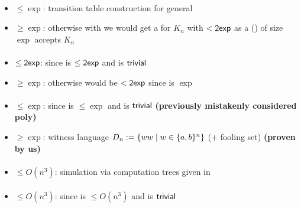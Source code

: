 \paragraph{\OMODLA{}\tto\ODFA}\label{cost:OM1DLAto1DFA}
\begin{itemize}
	\item $\le\exp$: transition table construction for general \OLA \cite{PigPis14}
	\item $\ge\exp$: otherwise with \hyperref[cost:OM1DLAto1DFA]{\OMODLA{}\tto\ODFA} we would get a \ODFA for $K_n$ with $<\mathsf{2exp}$ as a \OMODLA (\TDFA) of size $\exp$ accepts $K_n$
\end{itemize}
\paragraph{\OMOLA{}\tto\OMODLA}
\begin{itemize}
	\item $\le\mathsf{2exp}$: since \hyperref[cost:OM1LAto1DFA]{\OMOLA{}\tto\ODFA} is $\le\mathsf{2exp}$ and \ODFA{}\tto\OMODLA is $\mathsf{trivial}$
	\item $\ge\exp$: otherwise \hyperref[cost:OM1LAto1DFA]{\OMOLA{}\tto\ODFA} would be $<\mathsf{2exp}$ since \hyperref[cost:OM1DLAto1DFA]{\OMODLA{}\tto\ODFA} is $\exp$
\end{itemize}
\paragraph{\OMODLA{}\tto\ONFA}
\begin{itemize}
	\item $\le\exp$: since \hyperref[cost:OM1DLAto1DFA]{\OMODLA{}\tto\ODFA} is $\le\exp$ and \ODFA{}\tto\ONFA is $\mathsf{trivial}$ \textbf{(previously mistakenly considered poly)}
	\item $\ge\exp$: witness language $D_n:=\{ww\mid w\in\{a,b\}^n\}$ (\OMODLA + fooling set) \textbf{(proven by us)}
\end{itemize}
\paragraph{\OMODLA{}\tto\TDFA}\label{cost:OM1DLAto2DFA}
\begin{itemize}
	\item $\le O(n^3)$: simulation via computation trees given in \cite{PigPri23a}
\end{itemize}
\paragraph{\OMODLA{}\tto\TNFA}
\begin{itemize}
	\item $\le O(n^3)$: since \hyperref[cost:OM1DLAto2DFA]{\OMODLA{}\tto\TDFA} is $\le O(n^3)$ and \TDFA{}\tto\TNFA is $\mathsf{trivial}$
\end{itemize}



